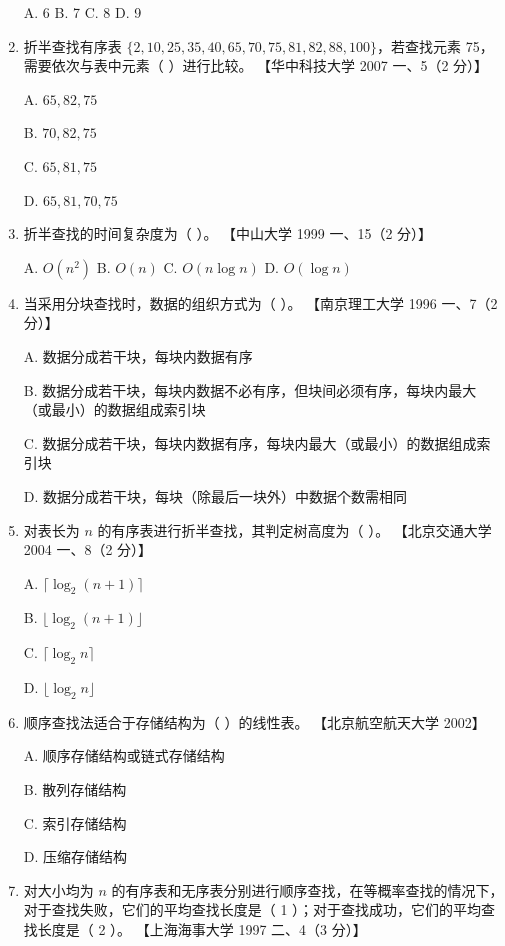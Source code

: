 \documentclass[lang=cn,newtx,10pt,scheme=chinese]{../../elegantbook}
\begin{document}
\begin{enumerate}
    A. 6 \quad B. 7 \quad C. 8 \quad D. 9  

    \item 折半查找有序表 $\{2, 10, 25, 35, 40, 65, 70, 75, 81, 82, 88, 100\}$，若查找元素 75，需要依次与表中元素（ ）进行比较。  
    【华中科技大学 2007 一、5（2 分）】  

    A. $65, 82, 75$  

    B. $70, 82, 75$  

    C. $65, 81, 75$  

    D. $65, 81, 70, 75$  

    \item 折半查找的时间复杂度为（ ）。  
    【中山大学 1999 一、15（2 分）】  

    A. $O(n^2)$ \quad B. $O(n)$ \quad C. $O(n \log n)$ \quad D. $O(\log n)$  

    \item 当采用分块查找时，数据的组织方式为（ ）。  
    【南京理工大学 1996 一、7（2 分）】  

    A. 数据分成若干块，每块内数据有序  

    B. 数据分成若干块，每块内数据不必有序，但块间必须有序，每块内最大（或最小）的数据组成索引块  

    C. 数据分成若干块，每块内数据有序，每块内最大（或最小）的数据组成索引块  

    D. 数据分成若干块，每块（除最后一块外）中数据个数需相同  

    \item 对表长为 $n$ 的有序表进行折半查找，其判定树高度为（ ）。  
    【北京交通大学 2004 一、8（2 分）】  

    A. $\lceil \log_2(n+1) \rceil$  

    B. $\lfloor \log_2(n+1) \rfloor$  

    C. $\lceil \log_2 n \rceil$  

    D. $\lfloor \log_2 n \rfloor$  

    \item 顺序查找法适合于存储结构为（ ）的线性表。  
    【北京航空航天大学 2002】  

    A. 顺序存储结构或链式存储结构 

    B. 散列存储结构  

    C. 索引存储结构  


    D. 压缩存储结构  

    \item 对大小均为 $n$ 的有序表和无序表分别进行顺序查找，在等概率查找的情况下，对于查找失败，它们的平均查找长度是（ 1 ）；对于查找成功，它们的平均查找长度是（ 2 ）。  
    【上海海事大学 1997 二、4（3 分）】  


\end{enumerate}
\end{document}
